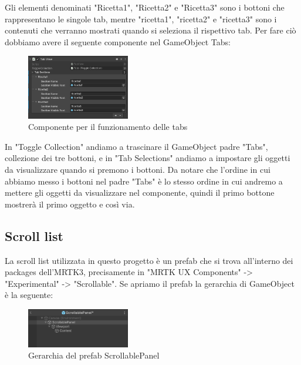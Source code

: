Gli elementi denominati "Ricetta1", "Ricetta2" e "Ricetta3" sono i bottoni che rappresentano le singole tab, mentre "ricetta1", "ricetta2" e "ricetta3" sono i contenuti che verranno mostrati quando si seleziona il rispettivo tab. Per fare ciò dobbiamo avere il seguente componente nel GameObject Tabs:

\begin{figure}[H]
    \centering
    \includegraphics[width=0.4\textwidth,height=\textheight,keepaspectratio]{figures/chapter_1/componente-tabs.png}
    \caption{Componente per il funzionamento delle tabs}
\end{figure}

 In "Toggle Collection" andiamo a trascinare il GameObject padre "Tabs", collezione dei tre bottoni, e in "Tab Selections" andiamo a impostare gli oggetti da visualizzare quando si premono i bottoni. Da notare che l'ordine in cui abbiamo messo i bottoni nel padre "Tabs" è lo stesso ordine in cui andremo a mettere gli oggetti da visualizzare nel componente, quindi il primo bottone mostrerà il primo oggetto e così via. \cite{MRTKtabs}

\subsection{Scroll list}
La scroll list utilizzata in questo progetto è un prefab che si trova all'interno dei packages dell'MRTK3, precisamente in "MRTK UX Components" -> "Experimental" -> "Scrollable". Se apriamo il prefab la gerarchia di GameObject è la seguente:

\begin{figure}[H]
    \centering
    \includegraphics[width=0.4\textwidth,height=\textheight,keepaspectratio]{figures/chapter_1/GerarchiascrollPanel.png}
    \caption{Gerarchia del prefab ScrollablePanel}
    \label{fig:scrollablePanel}
\end{figure}

